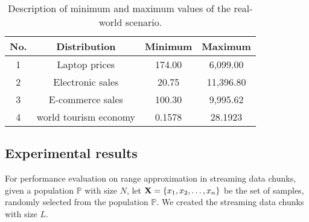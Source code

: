 \documentclass[lettersize,journal]{IEEEtran}
\begin{document}
\begin{table}[htbp]
    \centering
    \caption{Description of minimum and maximum values of the real-world scenario.}
    \label{tab:real-params}
    \begin{tabular}{cccc}
        \toprule
        \textbf{No.} & \textbf{Distribution} & \textbf{Minimum} & \textbf{Maximum} \\
        \midrule
        1 & Laptop prices & 174.00 & 6,099.00 \\
        \midrule
         2 & Electronic sales & 20.75 & 11,396.80 \\
         \midrule
         3 & E-commerce sales & 100.30 & 9,995.62 \\
         \midrule
         4 & world tourism economy & 0.1578 & 28.1923 \\
        \bottomrule
    \end{tabular}
\end{table}

\subsection{Experimental results}
For performance evaluation on range approximation in streaming data chunks, given a population $\mathbb{P}$ with size $N$, let ${\bf X} = \left\{x_1,x_2,\ldots,x_n \right\}$ be the set of samples, randomly selected from the population $\mathbb{P}$. We created the streaming data chunks with size $L$.


\end{document}
